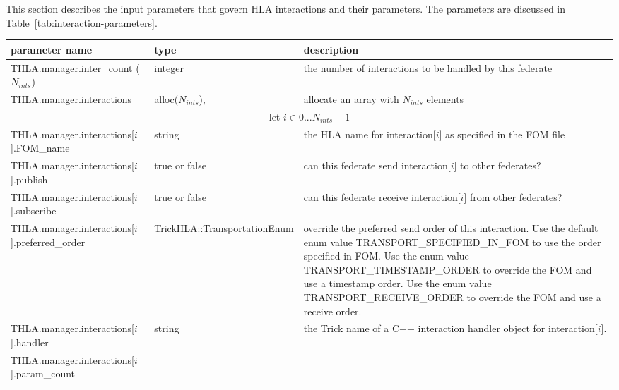 This section describes the input parameters that govern HLA
interactions and their parameters.
The parameters are discussed in Table~\ref{tab:interaction-parameters}.

\begin{table}[hb]
  \scriptsize
  \begin{center}
    \begin{tabular}{|p{2in}|l|p{3.25in}|}
    \hline
    parameter name & type & description \\
    \hline \hline
      {\ttfamily THLA.manager.\-inter\_count}
      ($N_{ints}$)
      & integer
      & the number of interactions to be handled by this federate
      \\
      \hline
      {\ttfamily THLA.manager.\-interactions}
      & alloc($N_{ints}$),
      & allocate an array with $N_{ints}$ elements
      \\
      \hline
      \hline
      \multicolumn{3}{|c|}{
        \rule[-3mm]{0mm}{7mm}
        let $i \in 0...N_{ints}-1$
      }
      \\
      \hline
      {\ttfamily THLA.manager.\-interactions[$i$].FOM\_name}
      & string
      & the HLA name for interaction[$i$] as specified in the FOM file
      \\
      \hline
      {\ttfamily THLA.manager.\-interactions[$i$].publish}
      & true or false
      & can this federate send interaction[$i$] to other federates?
      \\
      \hline
      {\ttfamily THLA.manager.\-interactions[$i$].subscribe}
      & true or false
      & can this federate receive interaction[$i$] from other federates?
      \\
    \hline
    {\ttfamily THLA.manager.\-interactions[$i$].preferred\_order}
    & {\ttfamily TrickHLA::TransportationEnum}
    & override the preferred send order of this interaction.
       Use the default enum value {\ttfamily TRANSPORT\_SPECIFIED\_IN\_FOM}
       to use the order specified in FOM.
       Use the enum value  {\ttfamily TRANSPORT\_TIMESTAMP\_ORDER} to override
       the FOM and use a timestamp order.
       Use the enum value  {\ttfamily TRANSPORT\_RECEIVE\_ORDER} to override
       the FOM and use a receive order.
      \\
      \hline
      {\ttfamily THLA.manager.\-interactions[$i$].handler}
      & string
      & the Trick name of a C++ interaction handler object for
        interaction[$i$].
      \\
      \hline
      {\ttfamily THLA.manager.\-interactions[$i$].param\_count}

\end{tabular}
\end{center}
\end{table}
